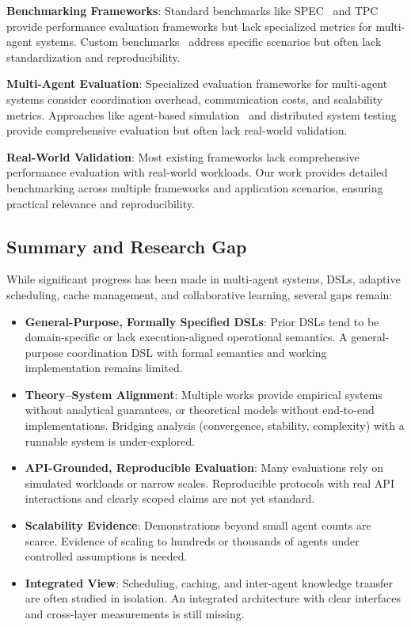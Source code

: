 \documentclass[conference]{IEEEtran}
\begin{document}
\textbf{Benchmarking Frameworks}: Standard benchmarks like SPEC~\cite{spec2019} and TPC~\cite{tpc2020} provide performance evaluation frameworks but lack specialized metrics for multi-agent systems. Custom benchmarks~\cite{custom_benchmark2021} address specific scenarios but often lack standardization and reproducibility.

\textbf{Multi-Agent Evaluation}: Specialized evaluation frameworks for multi-agent systems consider coordination overhead, communication costs, and scalability metrics. Approaches like agent-based simulation~\cite{agent_sim2022} and distributed system testing~\cite{dist_test2023} provide comprehensive evaluation but often lack real-world validation.

\textbf{Real-World Validation}: Most existing frameworks lack comprehensive performance evaluation with real-world workloads. Our work provides detailed benchmarking across multiple frameworks and application scenarios, ensuring practical relevance and reproducibility.

\subsection{Summary and Research Gap}

While significant progress has been made in multi-agent systems, DSLs, adaptive scheduling, cache management, and collaborative learning, several gaps remain:

\begin{itemize}
\item \textbf{General-Purpose, Formally Specified DSLs}: Prior DSLs tend to be domain-specific or lack execution-aligned operational semantics. A general-purpose coordination DSL with formal semantics and working implementation remains limited.
\item \textbf{Theory–System Alignment}: Multiple works provide empirical systems without analytical guarantees, or theoretical models without end-to-end implementations. Bridging analysis (convergence, stability, complexity) with a runnable system is under-explored.
\item \textbf{API-Grounded, Reproducible Evaluation}: Many evaluations rely on simulated workloads or narrow scales. Reproducible protocols with real API interactions and clearly scoped claims are not yet standard.
\item \textbf{Scalability Evidence}: Demonstrations beyond small agent counts are scarce. Evidence of scaling to hundreds or thousands of agents under controlled assumptions is needed.
\item \textbf{Integrated View}: Scheduling, caching, and inter-agent knowledge transfer are often studied in isolation. An integrated architecture with clear interfaces and cross-layer measurements is still missing.
\end{itemize}
\end{document}
